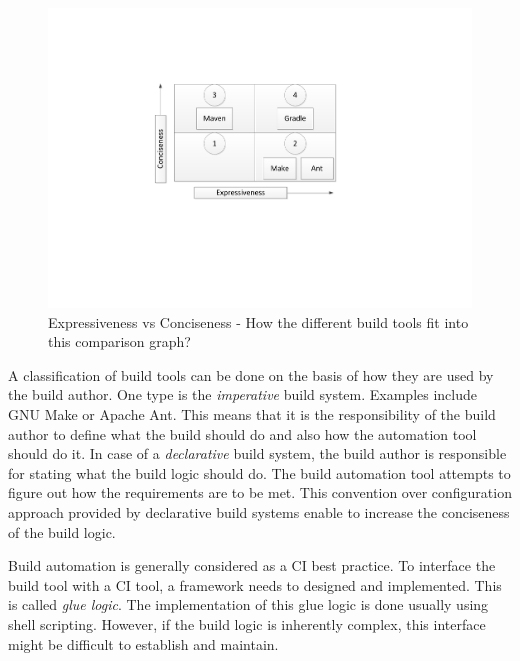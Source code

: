 \documentclass[12pt, a4paper, titlepage]{scrartcl}
\begin{document}
\begin{figure}[!ht]
\centering
	\includegraphics[scale=0.9, clip, trim=6cm 7cm 0cm 4cm]{ExpVsConc.pdf}
\caption{Expressiveness vs Conciseness - How the different build tools fit into this comparison graph?}
\label{fig:expr-vs-conc}
\end{figure}
\par A classification of build tools can be done on the basis of how they are used by the build author. One type is the \emph{imperative} build system. Examples include GNU Make or Apache Ant. This means that it is the responsibility of the build author to define what the build should do and also how the automation tool should do it. In case of a \emph{declarative} build system, the build author is responsible for stating what the build logic should do. The build automation tool attempts to figure out how the requirements are to be met. This convention over configuration approach provided by declarative build systems enable to increase the conciseness of the build logic. 
\par Build automation is generally considered as a CI best practice\cite{fowler2006continuous}. To interface the build tool with a CI tool, a framework needs to designed and implemented. This is called \emph{glue logic}. The implementation of this glue logic is done usually using shell scripting. However, if the build logic is inherently complex, this interface might be difficult to establish and maintain. 
\end{document}
